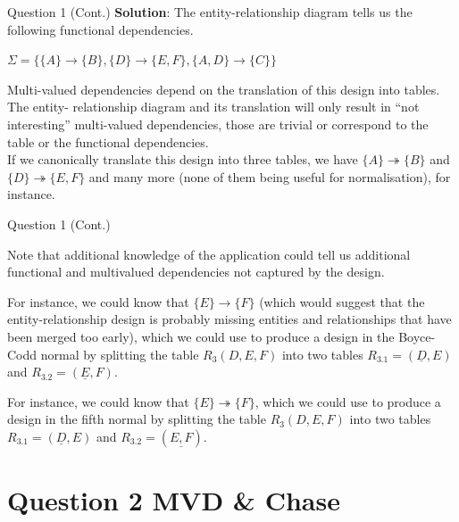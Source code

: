 \begin{frame}[fragile]{Question 1 (Cont.)}
\textbf{Solution}: The entity-relationship diagram tells us the following functional dependencies.\\ \vspace{5pt}

$\Sigma = \{\{A\}\rightarrow\{B\}, \{D\}\rightarrow\{E,F\}, \{A,D\}\rightarrow\{C\}\}$
\\ \vspace{10pt}

Multi-valued dependencies depend on the translation of this design into tables. The entity-
relationship diagram and its translation will only result in ``not interesting'' multi-valued dependencies, those are trivial or correspond to the table or the functional dependencies.\\ \vspace{5pt}
If we canonically translate this design into three tables, we have
$\{A\} \twoheadrightarrow \{B\}$ and $\{D\}\twoheadrightarrow \{E,F\}$ and many more (none of them being useful for normalisation), for instance.
\end{frame}

\begin{frame}[fragile]{Question 1 (Cont.)}
	
Note that additional knowledge of the application could tell us additional functional and multivalued dependencies not captured by the design.\\ \vspace{5pt}

For instance, we could know that $\{E\}\rightarrow\{F\}$ (which would suggest that the entity-relationship design is probably missing entities and relationships that have been merged too early), which we could use to produce a design in the Boyce-Codd normal by splitting the table $R_3(D,E,F)$ into two tables $R_{3.1}=(\underline{D},E)$ and $R_{3.2}=(\underline{E},F)$.\\ \vspace{5pt}

For instance, we could know that $\{E\}\twoheadrightarrow\{F\}$, which we could use to produce a design in the fifth normal by splitting the table $R_3(D,E,F)$ into two tables $R_{3.1}=(\underline{D},E)$ and $R_{3.2}=(\underline{E,F})$.	
\end{frame}

\section*{Question 2 MVD \& Chase}

